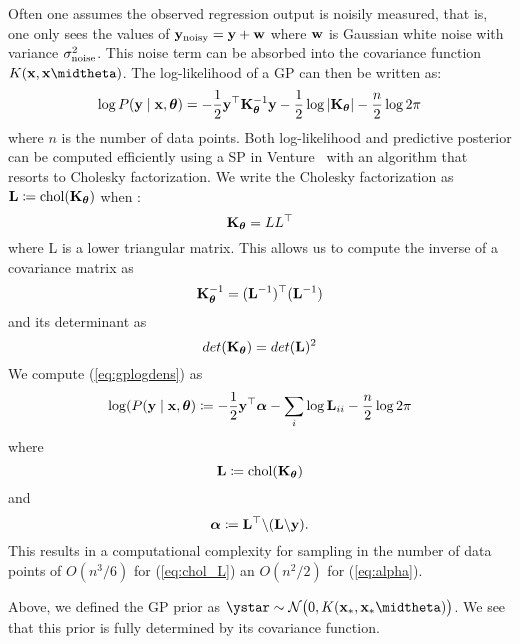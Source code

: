 Often one assumes the observed regression output is noisily measured, that is,
one only sees the values of $\mathbf{y}_{\textrm{noisy}} = \mathbf{y} + \mathbf{w}$ where $\mathbf{w}$ is
Gaussian white noise with variance $\sigma_{\textrm{noise}}^2$. This noise term can be
absorbed into the covariance function $K(\xbf,\xbf \midtheta)$.
The log-likelihood of a \ac{GP} can then be written as:
\begin{equation}
\label{eq:gplogdens}
\log P(\mathbf{y} \mid \mathbf{x},\bm{\theta}) =
-\frac12 \mathbf{y}^\top 
\mathbf{K}_{\bm{\theta}}^{-1} \mathbf{y}
- \frac12\log \left\lvert \mathbf{K}_{\bm{\theta}} \right\rvert
- \frac{n}{2}\log 2\pi
\end{equation}
where $n$ is the number of data points.
Both log-likelihood and predictive posterior can be computed efficiently using a \ac{SP} in Venture~\citep{mansinghka2014venture}
with an algorithm that resorts to Cholesky factorization\citep[chap. 2]{rasmussen2006gaussian}. 
We write the Cholesky factorization as 
$\mathbf{L} \coloneqq \text{chol}(\mathbf{K}_{\bm{\theta}})$ when
:
\begin{equation}
\mathbf{K}_{\bm{\theta}} = LL^\top
\end{equation}
where L is a lower triangular matrix. This allows us to compute the inverse of a covariance matrix as
\begin{equation}
\mathbf{K}_{\bm{\theta}}^{-1} = (\mathbf{L}^{-1})^\top (\mathbf{L}^{-1})
\end{equation}
and its determinant as 
\begin{equation}
det(\mathbf{K}_{\bm{\theta}}) = det(\mathbf{L})^2
\end{equation}
We compute (\ref{eq:gplogdens}) as
\begin{equation}
\log(P(\mathbf{y} \mid \mathbf{x}, \bm{\theta})\coloneqq - \frac{1}{2} \mathbf{y}^\top \bm{\alpha} - \sum_i \log \mathbf{L}_{ii} - \frac{n}{2} \log 2 \pi
\end{equation}
where 
\begin{equation}
\label{eq:chol_L}
\mathbf{L} \coloneqq \text{chol}(\mathbf{K}_{\bm{\theta}})
\end{equation}
and 
\begin{equation}
\label{eq:alpha}
\bm{\alpha} \coloneqq  \mathbf{L}^\top \backslash(\mathbf{L} \backslash \mathbf{y}). 
\end{equation}
This results in a computational complexity for sampling in the number of data points of $O(n^3/6)$ for (\ref{eq:chol_L}) an $O(n^2/2)$ for (\ref{eq:alpha}). 

Above, we defined the \ac{GP} prior as $\ystar \sim
\mathcal{N}\big(0,K(\xbf_*,\xbf_* \midtheta )\big)$.
We see that this prior is fully determined by its covariance function.
